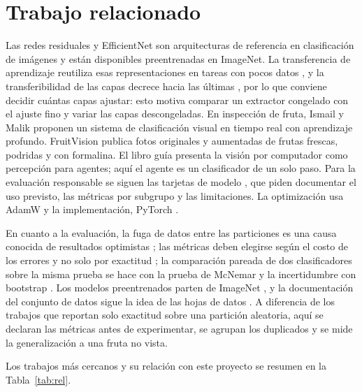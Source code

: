 \documentclass[10pt,twocolumn,letterpaper]{article}
\begin{document}
\section{Trabajo relacionado}
Las redes residuales \cite{he} y EfficientNet \cite{tan} son arquitecturas de referencia en clasificación de imágenes y están disponibles preentrenadas en ImageNet. La transferencia de aprendizaje reutiliza esas representaciones en tareas con pocos datos \cite{pan}, y la transferibilidad de las capas decrece hacia las últimas \cite{yos}, por lo que conviene decidir cuántas capas ajustar: esto motiva comparar un extractor congelado con el ajuste fino y variar las capas descongeladas. En inspección de fruta, Ismail y Malik \cite{ism} proponen un sistema de clasificación visual en tiempo real con aprendizaje profundo. FruitVision \cite{fv} publica fotos originales y aumentadas de frutas frescas, podridas y con formalina. El libro guía \cite{aima} presenta la visión por computador como percepción para agentes; aquí el agente es un clasificador de un solo paso. Para la evaluación responsable se siguen las tarjetas de modelo \cite{mit}, que piden documentar el uso previsto, las métricas por subgrupo y las limitaciones. La optimización usa AdamW \cite{loc} y la implementación, PyTorch \cite{pt}.

En cuanto a la evaluación, la fuga de datos entre las particiones es una causa conocida de resultados optimistas \cite{kau}; las métricas deben elegirse según el costo de los errores y no solo por exactitud \cite{sok}; la comparación pareada de dos clasificadores sobre la misma prueba se hace con la prueba de McNemar \cite{die} y la incertidumbre con bootstrap \cite{efr}. Los modelos preentrenados parten de ImageNet \cite{rus}, y la documentación del conjunto de datos sigue la idea de las hojas de datos \cite{geb}. A diferencia de los trabajos que reportan solo exactitud sobre una partición aleatoria, aquí se declaran las métricas antes de experimentar, se agrupan los duplicados y se mide la generalización a una fruta no vista.

Los trabajos más cercanos y su relación con este proyecto se resumen en la Tabla~\ref{tab:rel}.
\end{document}
